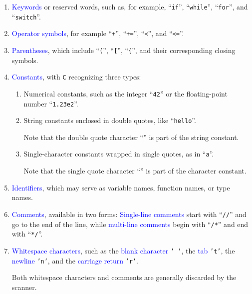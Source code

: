 \begin{enumerate}
\item \textcolor{blue}{Keywords} or reserved words, such as, for example, ``\texttt{if}'', ``\texttt{while}'', ``\texttt{for}'', and ``\texttt{switch}''.
\item \textcolor{blue}{Operator symbols}, for example ``\texttt{+}'', ``\texttt{+=}'', ``\texttt{<}'', and ``\texttt{<=}''.
\item \textcolor{blue}{Parentheses}, which include ``\texttt{(}'', ``\texttt{[}'', ``\texttt{\{}'', and their corresponding closing symbols.
\item \textcolor{blue}{Constants}, with \texttt{C} recognizing three types:
    \begin{enumerate}
    \item Numerical constants, such as the integer ``\texttt{42}'' or the floating-point number ``\texttt{1.23e2}''.
    \item String constants enclosed in double quotes, like ``\texttt{hello}''.

          Note that the double quote character ``\texttt{}'' is part of the string constant.
    \item Single-character constants wrapped in single quotes, as in ``\texttt{a}''.

          Note that the single quote character ``\texttt{}'' is part of the character constant.
    \end{enumerate}
\item \textcolor{blue}{Identifiers}, which may serve as variable names, function names, or type names.
\item \textcolor{blue}{Comments}, available in two forms: \textcolor{blue}{Single-line comments} start with ``\texttt{//}'' and go to the end of the line, while \textcolor{blue}{multi-line comments} begin with ``\texttt{/*}'' and end with ``\texttt{*/}''.
\item \textcolor{blue}{Whitespace characters}, such as the \textcolor{blue}{blank character} \texttt{' '}, the \textcolor{blue}{tab} \texttt{'t'}, the \textcolor{blue}{newline} \texttt{'n'}, and the \textcolor{blue}{carriage return} \texttt{'r'}. 

Both whitespace characters and comments are generally discarded by the scanner.
\end{enumerate}

